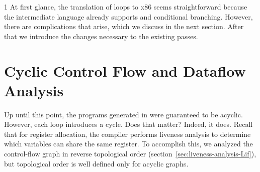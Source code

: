 \documentclass[7x10]{TimesAPriori_MIT}%
\def\pythonEd{1}
\providecommand{\BookEdition}{1}
\let\edition\BookEdition
\newcommand{\pythonColor}[0]{}
\numberwithin{theorem}{chapter}
\numberwithin{definition}{chapter}
\numberwithin{equation}{chapter}
\begin{document}
{\if\edition\pythonEd\pythonColor
%
At first glance, the translation of  loops to x86 seems
straightforward because the \LangCIf{} intermediate language already
supports  and conditional branching. However, there are
complications that arise, which we discuss in the next section. After
that we introduce the changes necessary to the existing passes.
%
\fi}

\section{Cyclic Control Flow and Dataflow Analysis}
\label{sec:dataflow-analysis}

Up until this point, the programs generated in
 were guaranteed to be acyclic. However, each
 loop introduces a cycle. Does that matter?
%
Indeed, it does.  Recall that for register allocation, the compiler
performs liveness analysis to determine which variables can share the
same register.  To accomplish this, we analyzed the control-flow graph
in reverse topological order
(section~\ref{sec:liveness-analysis-Lif}), but topological order is
well defined only for acyclic graphs.
\end{document}
